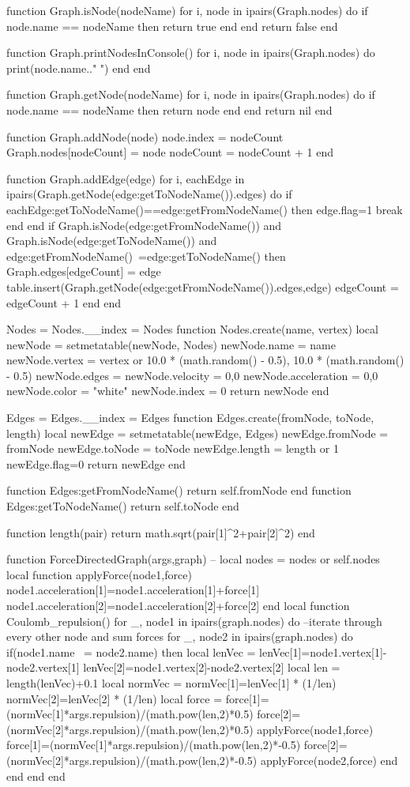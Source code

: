 function Graph.isNode(nodeName)
	for i, node in ipairs(Graph.nodes) do
		if node.name == nodeName then 
			return true 
		end
	end
	return false
end

function Graph.printNodesInConsole()
	for i, node in ipairs(Graph.nodes) do
		print(node.name.." ")
	end
end

function Graph.getNode(nodeName)
	for i, node in ipairs(Graph.nodes) do
		if node.name == nodeName then
			return node
		end
	end	
	return nil
end

function Graph.addNode(node)
	node.index = nodeCount
	Graph.nodes[nodeCount] = node
	nodeCount = nodeCount + 1
end

function Graph.addEdge(edge)
	for i, eachEdge in ipairs(Graph.getNode(edge:getToNodeName()).edges) do
		if eachEdge:getToNodeName()==edge:getFromNodeName() then
			edge.flag=1
			break
		end
	end
	if Graph.isNode(edge:getFromNodeName())  and Graph.isNode(edge:getToNodeName()) and edge:getFromNodeName()~=edge:getToNodeName() then
		Graph.edges[edgeCount] = edge
		table.insert(Graph.getNode(edge:getFromNodeName()).edges,edge)
		edgeCount = edgeCount + 1
	end
end


Nodes = {}
Nodes.__index = Nodes
function Nodes.create(name, vertex)
	local newNode = {}
	setmetatable(newNode, Nodes)	
	newNode.name = name
	newNode.vertex = vertex or {10.0 * (math.random() - 0.5), 10.0 * (math.random() - 0.5)}
	newNode.edges = {}
	newNode.velocity = {0,0}
	newNode.acceleration = {0,0}
	newNode.color = "white"
	newNode.index = 0
	return newNode
end

Edges = {}
Edges.__index = Edges
function Edges.create(fromNode, toNode, length)
	local newEdge = {}
	setmetatable(newEdge, Edges)	
	newEdge.fromNode = fromNode
	newEdge.toNode = toNode
	newEdge.length = length or 1
	newEdge.flag=0
	return newEdge
end

function Edges:getFromNodeName()
	return self.fromNode
end
function Edges:getToNodeName()
	return self.toNode
end

function length(pair)
	return math.sqrt(pair[1]^2+pair[2]^2)
end

function ForceDirectedGraph(args,graph)
	-- local nodes = nodes or self.nodes
	local function applyForce(node1,force)
		node1.acceleration[1]=node1.acceleration[1]+force[1]
		node1.acceleration[2]=node1.acceleration[2]+force[2]
	end
	local function Coulomb_repulsion()
		for _, node1 in ipairs(graph.nodes) do
				--iterate through every other node and sum forces
			for _, node2 in ipairs(graph.nodes) do
				if(node1.name ~= node2.name) then
					local lenVec = {}
					lenVec[1]=node1.vertex[1]-node2.vertex[1]
					lenVec[2]=node1.vertex[2]-node2.vertex[2]
					local len = length(lenVec)+0.1
					local normVec = {}
					normVec[1]=lenVec[1] * (1/len)
					normVec[2]=lenVec[2] * (1/len)
					local force = {}
					force[1]=(normVec[1]*args.repulsion)/(math.pow(len,2)*0.5)
					force[2]=(normVec[2]*args.repulsion)/(math.pow(len,2)*0.5)
					applyForce(node1,force)
					force[1]=(normVec[1]*args.repulsion)/(math.pow(len,2)*-0.5)
					force[2]=(normVec[2]*args.repulsion)/(math.pow(len,2)*-0.5)
					applyForce(node2,force)
				end
			end
		end
	end

